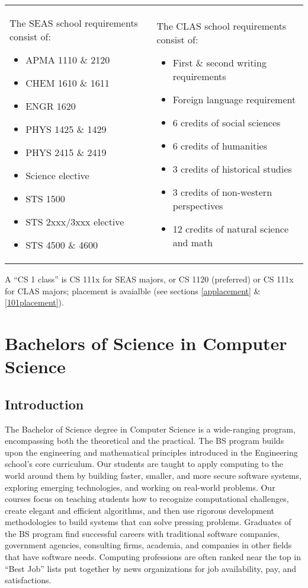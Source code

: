 \documentclass[10pt,letter]{book}
\newenvironment{itemlist}{
\begin{itemize}
\setlength{\itemsep}{0pt}
\setlength{\parskip}{0pt}}
{\end{itemize}}
\newcommand{\mychapter}[2]{\chapter{#1}\renewcommand{\leftmark}{\textsc{#2}}}
\newcommand{\mysection}[1]{\section{#1}\renewcommand{\rightmark}{#1}}
\begin{document}
\noindent
\begin{tabular}{p{2in}p{2.25in}}

The SEAS school requirements consist of:
\begin{itemlist}
\item APMA 1110 \& 2120
\item CHEM 1610 \& 1611
\item ENGR 1620
\item PHYS 1425 \& 1429
\item PHYS 2415 \& 2419
\item Science elective
\item STS 1500
\item STS 2xxx/3xxx elective
\item STS 4500 \& 4600
\end{itemlist}

&

The CLAS school requirements consist of:
\begin{itemlist}
\item First \& second writing requirements
\item Foreign language requirement
\item 6 credits of social sciences
\item 6 credits of humanities
\item 3 credits of historical studies
\item 3 credits of non-western perspectives
\item 12 credits of natural science and math
\end{itemlist}

\end{tabular}

\noindent A ``CS 1 class'' is CS 111x for SEAS majors, or CS 1120
(preferred) or CS 111x for CLAS majors; placement is avaialble (see
sections \ref{applacement} \& \ref{101placement}).

\clearpage
\mychapter{Bachelors of Science in Computer Science}{BS CS Degree}


\mysection{Introduction}


The Bachelor of Science degree in Computer Science is a wide-ranging
program, encompassing both the theoretical and the practical.  The BS
program builds upon the engineering and mathematical principles
introduced in the Engineering school's core curriculum.  Our students
are taught to apply computing to the world around them by building
faster, smaller, and more secure software systems, exploring emerging
technologies, and working on real-world problems.  Our courses focus
on teaching students how to recognize computational challenges, create
elegant and efficient algorithms, and then use rigorous development
methodologies to build systems that can solve pressing
problems. Graduates of the BS program find successful careers with
traditional software companies, government agencies, consulting firms,
academia, and companies in other fields that have software needs.
Computing professions are often ranked near the top in ``Best Job''
lists put together by news organizations for job availability, pay,
and satisfactions.
\end{document}
